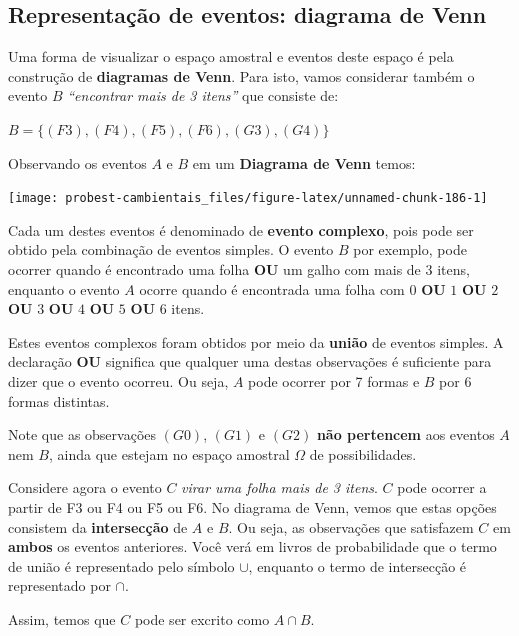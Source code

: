 \documentclass[
]{book}
\begin{document}
\hypertarget{representauxe7uxe3o-de-eventos-diagrama-de-venn}{%
\subsection{Representação de eventos: diagrama de Venn}\label{representauxe7uxe3o-de-eventos-diagrama-de-venn}}

Uma forma de visualizar o espaço amostral e eventos deste espaço é pela construção de \textbf{diagramas de Venn}. Para isto, vamos considerar também o evento \(B\) \emph{``encontrar mais de 3 itens''} que consiste de:

\(B = \{(F3), (F4), (F5), (F6), (G3), (G4)\}\)

Observando os eventos \(A\) e \(B\) em um \textbf{Diagrama de Venn} temos:

\begin{center}\texttt{[image: probest-cambientais\_files/figure-latex/unnamed-chunk-186-1]} \end{center}

Cada um destes eventos é denominado de \textbf{evento complexo}, pois pode ser obtido pela combinação de eventos simples. O evento \(B\) por exemplo, pode ocorrer quando é encontrado uma folha \textbf{OU} um galho com mais de 3 itens, enquanto o evento \(A\) ocorre quando é encontrada uma folha com \(0\) \textbf{OU} \(1\) \textbf{OU} \(2\) \textbf{OU} \(3\) \textbf{OU} \(4\) \textbf{OU} \(5\) \textbf{OU} \(6\) itens.

Estes eventos complexos foram obtidos por meio da \textbf{união} de eventos simples. A declaração \textbf{OU} significa que qualquer uma destas observações é suficiente para dizer que o evento ocorreu. Ou seja, \(A\) pode ocorrer por 7 formas e \(B\) por 6 formas distintas.

Note que as observações \((G0)\), \((G1)\) e \((G2)\) \textbf{não pertencem} aos eventos \(A\) nem \(B\), ainda que estejam no espaço amostral \(\Omega\) de possibilidades.

Considere agora o evento \(C\) \emph{virar uma folha mais de 3 itens}. \(C\) pode ocorrer a partir de F3 ou F4 ou F5 ou F6. No diagrama de Venn, vemos que estas opções consistem da \textbf{intersecção} de \(A\) e \(B\). Ou seja, as observações que satisfazem \(C\) em \textbf{ambos} os eventos anteriores. Você verá em livros de probabilidade que o termo de união é representado pelo símbolo \(\cup\), enquanto o termo de intersecção é representado por \(\cap\).

Assim, temos que \(C\) pode ser excrito como \(A \cap B\).
\end{document}
